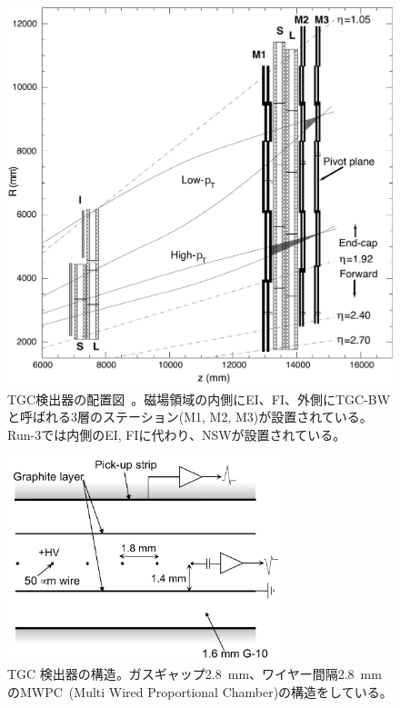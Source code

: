 \begin{figure}[tbp]
  \centering
  \vspace{50pt}
  \includegraphics[clip, width=14cm]{fig/2/l1mue-schema.pdf}
  \caption{TGC検出器の配置図~\cite{Aad:1129811}。磁場領域の内側にEI、FI、外側にTGC-BWと呼ばれる3層のステーション(M1, M2, M3)が設置されている。Run-3では内側のEI, FIに代わり、NSWが設置されている。}
  \label{fig:TGC_st}
\end{figure}


\begin{figure}[tb]
  \centering
    \includegraphics[clip, width=8cm]{fig/2/TGC_anode_wire.pdf}
  \caption{TGC 検出器の構造\cite{Aad:1129811}。ガスギャップ2.8~mm、ワイヤー間隔2.8~mmのMWPC~(Multi
Wired Proportional Chamber)の構造をしている。}
  \label{fig:MWPC}
\end{figure}

